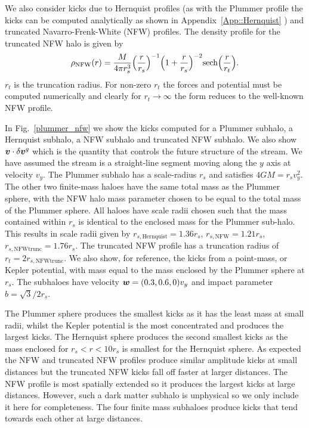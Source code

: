 \documentclass[useAMS,usenatbib,fleqn,a4paper]{mn2e}
\newcommand{\bs}[1]{\bmath{#1}}
\begin{document}
We also consider kicks due to Hernquist profiles (as with the Plummer profile the kicks can be computed analytically as shown in Appendix~\ref{App::Hernquist} ) and truncated Navarro-Frenk-White (NFW) profiles. The density profile for the truncated NFW halo is given by
\begin{equation}
\rho_{\rm NFW}(r) = \frac{M}{4\pi r_s^3}\Big(\frac{r}{r_s}\Big)^{-1}\Big(1+\frac{r}{r_s}\Big)^{-2}\mathrm{sech}\Big(\frac{r}{r_t}\Big).
\end{equation}
$r_t$ is the truncation radius. For non-zero $r_t$ the forces and potential must be computed numerically and clearly for $r_t\rightarrow\infty$ the form reduces to the well-known NFW profile.

In Fig.~\ref{plummer_nfw} we show the kicks computed for a Plummer subhalo, a Hernquist subhalo, a NFW subhalo and truncated NFW subhalo. We also show $\bs{v}\cdot\delta\bs{v}^g$ which is the quantity that controls the future structure of the stream. We have assumed the stream is a straight-line segment moving along the $y$ axis at velocity $v_y$. The Plummer subhalo has a scale-radius $r_s$ and satisfies $4GM=r_sv_y^2$. The other two finite-mass haloes have the same total mass as the Plummer sphere, with the NFW halo mass parameter chosen to be equal to the total mass of the Plummer sphere. All haloes have scale radii chosen such that the mass contained within $r_s$ is identical to the enclosed mass for the Plummer sub-halo. This results in scale radii given by $r_{s,\mathrm{Hernquist}}=1.36r_s$, $r_{s,\mathrm{NFW}}=1.21r_s$, $r_{s,\mathrm{NFW trunc}}=1.76r_s$. The truncated NFW profile has a truncation radius of $r_t=2r_{s,\mathrm{NFW trunc}}$. We also show, for reference, the kicks from a point-mass, or Kepler potential, with mass equal to the mass enclosed by the Plummer sphere at $r_s$. The subhaloes have velocity $\bs{w}=(0.3,0.6,0)v_y$ and impact parameter $b=\sqrt{3}/2r_s$.

The Plummer sphere produces the smallest kicks as it has the least mass at small radii, whilst the Kepler potential is the most concentrated and produces the largest kicks. The Hernquist sphere produces the second smallest kicks as the mass enclosed for $r_s<r<10r_s$ is smallest for the Hernquist sphere. As expected the NFW and truncated NFW profiles produce similar amplitude kicks at small distances but the truncated NFW kicks fall off faster at larger distances. The NFW profile is most spatially extended so it produces the largest kicks at large distances. However, such a dark matter subhalo is unphysical so we only include it here for completeness. The four finite mass subhaloes produce kicks that tend towards each other at large distances.
\end{document}

